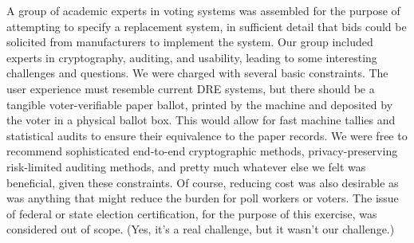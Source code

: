 A group of academic experts in voting systems was assembled for the
purpose of attempting to specify a replacement system, in sufficient
detail that bids could be solicited from manufacturers to implement
the system. Our group included experts in cryptography, auditing, and
usability, leading to some interesting challenges and questions. We
were charged with several basic constraints. The user experience must
resemble current DRE systems, but there should be a tangible
voter-verifiable paper ballot, printed by the machine and deposited by
the voter in a physical ballot box. This would allow for fast machine
tallies and statistical audits to ensure their equivalence to the
paper records. We were free to recommend sophisticated end-to-end
cryptographic methods, privacy-preserving risk-limited auditing
methods, and pretty much whatever else we felt was beneficial, given
these constraints. Of course, reducing cost was also desirable as was
anything that might reduce the burden for poll workers or voters. The
issue of federal or state election certification, for the purpose of
this exercise, was considered out of scope. (Yes, it's a real
challenge, but it wasn't our challenge.)


